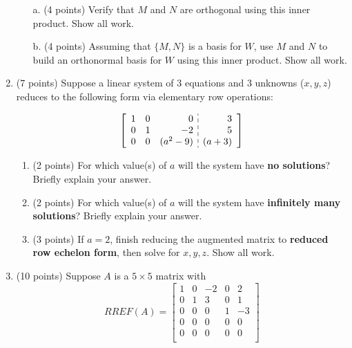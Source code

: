 \documentclass[12pt]{extarticle}
\begin{document}
\begin{enumerate}
\begin{itemize}
\item[a.] (4 points) Verify that $M$ and $N$ are orthogonal using this inner product. Show all work.

\vfill
\item[b.] (4 points) Assuming that $\{M,N\}$ is a basis for $W$, use $M$ and $N$ to build an orthonormal basis for $W$ using this inner product. Show all work.

\vfill
\end{itemize}

\newpage


\newpage




\newpage

\item (7 points)  Suppose a linear system of 3 equations and 3 unknowns ($x,y,z$) reduces to the following form via elementary row operations:
 
        \[ 
\barray{rrr;{4pt/3pt}r}{
1 & 0 & 0 & 3 \\ 0 & 1 & -2 & 5 \\ 0& 0 & (a^2-9)& (a+3)} 
\]   
  
  
  
  
    \begin{enumerate}
        \item (2 points)  For which value(s) of $a$ will the system have \textbf{no solutions}? Briefly explain your answer.
        \vspace{1.5in}

     \item (2 points)  For which value(s) of $a$ will the system have \textbf{infinitely many solutions}? Briefly explain your answer.
        \vspace{1.5in}
        
        \item (3 points) If $a=2$, finish reducing the augmented matrix to \textbf{reduced row echelon form},  then solve for $x,y,z$. Show all work.

               \vspace{3in} 
 
    
    \end{enumerate}


\newpage


\item (10 points)
Suppose $A$ is a $5\times 5$ matrix with $$RREF(A)=\left[\begin{array}{ccccc}
1 & 0 & -2 & 0 & 2
\\
 0 & 1 & 3 & 0 & 1
\\
 0 & 0 & 0 & 1 & -3
\\
 0 & 0 & 0 & 0 & 0 \\
  0 & 0 & 0 & 0 & 0 \\
\end{array}\right]$$


\end{enumerate}
\end{document}
